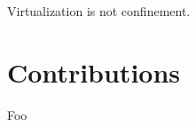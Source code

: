 Virtualization is not confinement.

\begin{comment}
- Virtualization is not confinement
  - To security experts, this should be an obvious statement
  - After all, each of these properties addresses an entirely different problem
  - Virtualization describes the goal of providing a unique, private mapping of shared resources,
    allowing an ...................
  - Confinement ...................
- But not everybody is a security expert
- Despite clear differences, virtualization and confinement are often conflated
\end{comment}

\section{Contributions}

Foo
